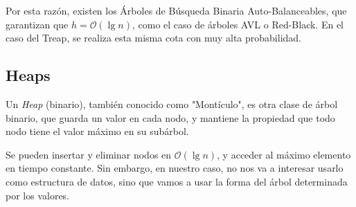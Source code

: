 Por esta razón, existen los Árboles de Búsqueda Binaria Auto-Balanceables,
que garantizan que \(h = \mathcal{O}(\lg n)\), como el caso de árboles AVL o Red-Black.
En el caso del Treap, se realiza esta misma cota con muy alta probabilidad.

\subsection{Heaps}

Un \textit{Heap} (binario), también conocido como "Montículo", es otra clase de árbol binario,
que guarda un valor en cada nodo, y mantiene la propiedad que todo nodo tiene
el valor máximo en su subárbol.



Se pueden insertar y eliminar nodos en $\mathcal{O}(\lg n)$, y acceder al máximo elemento en tiempo constante.
Sin embargo, en nuestro caso, no nos va a interesar usarlo como estructura de datos,
sino que vamos a usar la forma del árbol determinada por los valores.